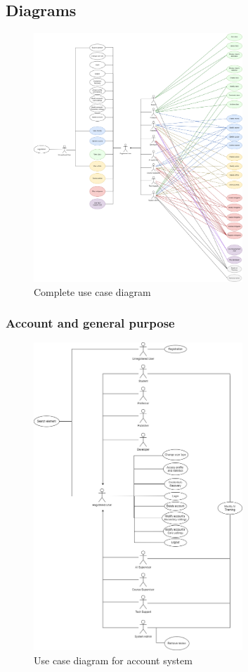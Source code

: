 \newpage
\subsection{Diagrams}
\begin{figure}[h]
	\centering
	\includegraphics[width=0.7\textwidth]{images/usecase-diagram.png}
	\caption{Complete use case diagram}
	\label{fig:usecase-diagram}
\end{figure}

\newpage
\subsubsection{Account and general purpose}
\begin{figure}[h]
	\centering
	\includegraphics[width=0.7\textwidth]{images/UC-account.png}
	\caption{Use case diagram for account system}
	\label{fig:UC-account}
\end{figure}

